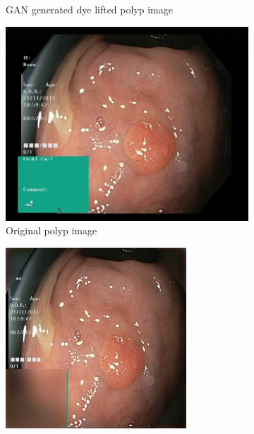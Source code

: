 \begin{figure}
\begin{subfigure}[t]{\myfigsizethree}
            \caption{GAN generated dye lifted polyp image}    
            \label{fig:dlp_GAN_BOTH2}
        \end{subfigure}
        \qquad\vfill%
		\begin{subfigure}[t]{\myfigsizethree}   
            \centering 
            \includegraphics[height=\textwidth ,width=\textwidth]{experiments/figures/both/greenORIG.jpg}
            \caption{Original polyp image}    
            \label{fig:p_ORIG_BOTH2}
        \end{subfigure}
        \qquad
        \begin{subfigure}[t]{\myfigsizethree}   
            \centering 
            \includegraphics[width=\textwidth]{experiments/figures/both/greenAE.jpg}

\end{subfigure}
\end{figure}
